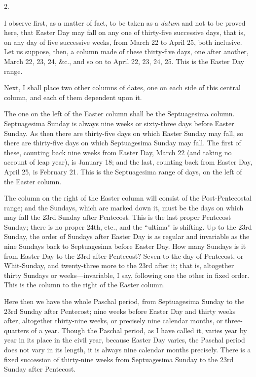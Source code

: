 2.

I observe first, as a matter
of fact, to be taken as a \emph{datum} and not to be proved here, that
Easter Day may fall on any one of thirty-five successive days, that
is, on any day of five successive weeks, from March 22 to April 25,
both inclusive. Let us suppose, then, a column made of these
thirty-five days, one after another, March 22, 23, 24, \&c., and so
on to April 22, 23, 24, 25. This is the Easter Day range.

Next, I shall place two other
columns of dates, one on each side of this central column, and each of
them dependent upon it.

The one on the left of the
Easter column shall be the Septuagesima column. Septuagesima Sunday is
always nine weeks or sixty-three days before Easter Sunday. As then
there are thirty-five days on which Easter Sunday may fall, so there
are thirty-five days on which Septuagesima Sunday may fall. The first
of these, counting back nine weeks from Easter Day, March 22 (and
taking no account of leap year), is January 18; and the last, counting
back from Easter Day, April 25, is February 21. This is the
Septuagesima range of days, on the left of the Easter column.

The column on the right of the
Easter column will consist of the Post-Pentecostal range; and the
Sundays, which are marked down it, must be the days on which may fall
the 23rd Sunday after Pentecost. This is the last proper Pentecost Sunday;
there is no proper 24th, etc., and the ``ultima'' is shifting. Up to
the 23rd Sunday, the order of Sundays after Easter Day is as regular
and invariable as the nine Sundays back to Septuagesima before Easter
Day. How many Sundays is it from Easter Day to the 23rd after
Pentecost? Seven to the day of Pentecost, or Whit-Sunday, and
twenty-three more to the 23rd after it; that is, altogether thirty
Sundays or weeks—invariable, I say, following one the other in fixed
order. This is the column to the right of the Easter column.

Here then we have the whole
Paschal period, from Septuagesima Sunday to the 23rd Sunday after
Pentecost; nine weeks before Easter Day and thirty weeks after,
altogether thirty-nine weeks, or precisely nine calendar months, or
three-quarters of a year. Though the Paschal period, as I have called
it, varies year by year in its place in the civil year, because Easter
Day varies, the Paschal period does not vary in its length, it is
always nine calendar months precisely. There is a fixed succession of
thirty-nine weeks from Septuagesima Sunday to the 23rd Sunday after
Pentecost.

